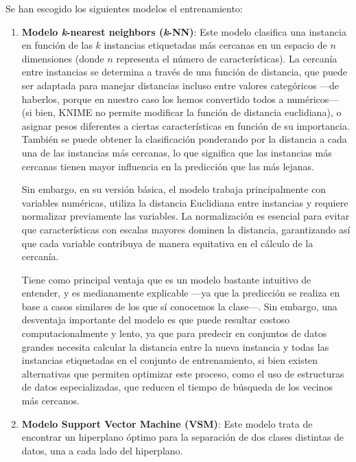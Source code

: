 Se han escogido los siguientes modelos el entrenamiento:

\begin{enumerate}

    \item \textbf{Modelo \textit{k}-nearest neighbors (\textit{k}-NN)}: Este modelo clasifica una instancia en función de las $k$ instancias etiquetadas más cercanas en un espacio de $n$ dimensiones (donde $n$ representa el número de características). La cercanía entre instancias se determina a través de una función de distancia, que puede ser adaptada para manejar distancias incluso entre valores categóricos ---de haberlos, porque en nuestro caso los hemos convertido todos a numéricos--- (si bien, KNIME no permite modificar la función de distancia euclidiana), o asignar pesos diferentes a ciertas características en función de su importancia. También se puede obtener la clasificación ponderando por la distancia a cada una de las instancias más cercanas, lo que significa que las instancias más cercanas tienen mayor influencia en la predicción que las más lejanas.

    Sin embargo, en su versión básica, el modelo trabaja principalmente con variables numéricas, utiliza la distancia Euclidiana entre instancias y requiere normalizar previamente las variables. La normalización es esencial para evitar que características con escalas mayores dominen la distancia, garantizando así que cada variable contribuya de manera equitativa en el cálculo de la cercanía.

    Tiene como principal ventaja que es un modelo bastante intuitivo de entender, y es medianamente explicable ---ya que la predicción se realiza en base a casos similares de los que sí conocemos la clase---. Sin embargo, una desventaja importante del modelo es que puede resultar costoso computacionalmente y lento, ya que para predecir en conjuntos de datos grandes necesita calcular la distancia entre la nueva instancia y todas las instancias etiquetadas en el conjunto de entrenamiento, si bien existen alternativas que permiten optimizar este proceso, como el uso de estructuras de datos especializadas, que reducen el tiempo de búsqueda de los vecinos más cercanos. 


    \item \textbf{Modelo Support Vector Machine (VSM)}: Este modelo trata de encontrar un hiperplano óptimo para la separación de dos clases distintas de datos, una a cada lado del hiperplano.
    

\end{enumerate}
